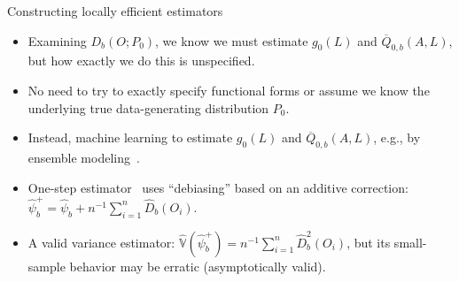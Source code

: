 \documentclass{beamer}
\begin{document}
\begin{frame}[c]{Constructing locally efficient estimators}

\begin{center}
\begin{itemize}
  \itemsep6pt
  \item Examining $D_b(O; P_0)$, we know we must estimate $g_0(L)$ and
    $\overline{Q}_{0,b}(A,L)$, but how exactly we do this is unspecified.
  \item No need to try to exactly specify functional forms or assume we know the
    underlying true data-generating distribution $P_0$.
  \item Instead, machine learning to estimate $g_0(L)$ and
    $\overline{Q}_{0,b}(A,L)$, e.g., by ensemble
    modeling~\citep{vdl2007super}.
  \item One-step estimator~\citep{bickel1993efficient} uses ``debiasing'' based
    on an additive correction: $\hat{\psi}_{b}^{+} = \hat{\psi}_{b} + n^{-1}
     \sum_{i=1}^n \hat{D}_b(O_i)$.
  \item A valid variance estimator: $\hat{\mathbb{V}}(\hat{\psi}_b^{+}) =
    n^{-1} \sum_{i=1}^n \hat{D}_b^2(O_i)$, but its small-sample behavior may be
    erratic (asymptotically valid).
\end{itemize}
\end{center}

\end{frame}

\end{document}
